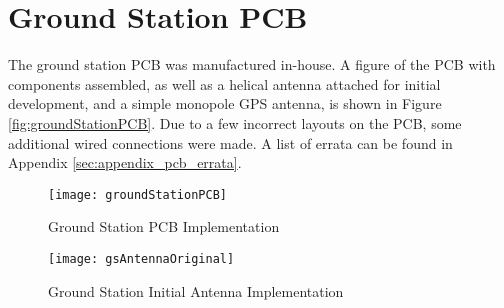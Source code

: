 \graphicspath{{./figures}}

\section{Ground Station PCB}

The ground station PCB was manufactured in-house. A figure of the PCB with components assembled, as well as a helical antenna attached for initial development, and a simple monopole GPS antenna, is shown in Figure \ref{fig:groundStationPCB}. Due to a few incorrect layouts on the PCB, some additional wired connections were made. A list of errata can be found in Appendix \ref{sec:appendix_pcb_errata}.


\begin{figure}[!htb]
  \begin{minipage}{.49\textwidth}
    \centering
    \texttt{[image: groundStationPCB]}
    \caption{Ground Station PCB Implementation}
    \label{fig:groundStationPCB}
  \end{minipage}
  \begin{minipage}{.49\textwidth}
    \centering
    \texttt{[image: gsAntennaOriginal]}
    \caption{Ground Station Initial Antenna Implementation}
    \label{fig:gsAntennaOriginal}
  \end{minipage}
\end{figure}